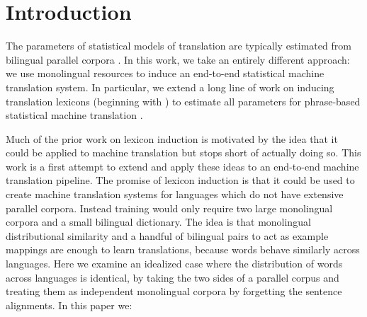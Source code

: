 \documentclass[11pt]{article}
\newcommand{\mnote}[1]{\marginpar{%
  \vskip-\baselineskip
  \raggedright\footnotesize
  \itshape\hrule\smallskip\tiny{#1}\par\smallskip\hrule}}
\newcommand{\mtodo}[1]{\mnote{\textcolor{red}{#1}}}
\begin{document}
\begin{abstract}
\end{abstract}


\section{Introduction} \label{sect:intro}

The parameters of statistical models of translation are typically estimated from bilingual parallel corpora \cite{Brown:1993}. 
In this work, we take an entirely different approach: we use monolingual resources to induce an end-to-end statistical machine translation system.  In particular, we extend a long line of work on inducing translation lexicons (beginning with ) to estimate all parameters for phrase-based statistical machine translation \cite{Koehn:2003}.

Much of the prior work on lexicon induction is motivated by the idea that it could be applied to machine translation but stops short of actually doing so.  This work is a first attempt to extend and apply these ideas to an end-to-end machine translation pipeline. 
The promise of lexicon induction is that it could be used to create machine translation systems for languages which do not have extensive parallel corpora.  
Instead training would only require two large monolingual corpora and a small bilingual dictionary.
The idea is that monolingual distributional similarity and a handful of bilingual pairs to act as example mappings are enough to learn translations, because words behave similarly across languages.  Here we examine an idealized case where the distribution of words across languages is identical, by taking the two sides of a parallel corpus and treating them as independent monolingual corpora by forgetting the sentence alignments. In this paper we:
\end{document}
